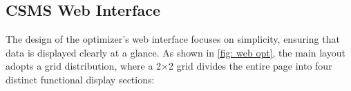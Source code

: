 \documentclass[
	english,
	ruledheaders=section,%
	class=report,%
	thesis={type=Report},%
	accentcolor=9c,%
	custommargins=true,%
	marginpar=false,%
	parskip=half-,%
	fontsize=11pt,%
	logofile={img/tuda_logo.pdf}, %
]{tudapub}
\begin{document}


\subsection{CSMS Web Interface}


The design of the optimizer's web interface focuses on simplicity, ensuring that data is displayed clearly at a glance. As shown in \autoref{fig: web opt}, the main layout adopts a grid distribution, where a 2×2 grid divides the entire page into four distinct functional display sections:  
    
\end{document}
